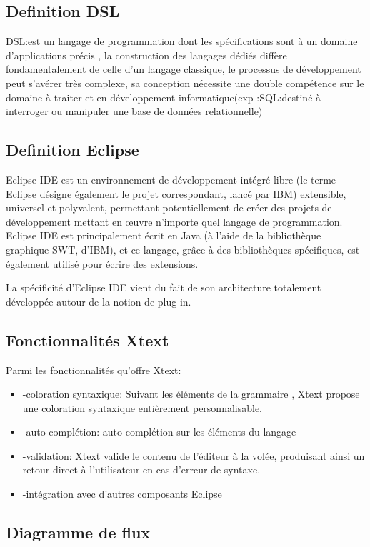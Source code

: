 \documentclass{article}
\begin{document}
\subsection{Definition DSL}
DSL:est un langage de programmation dont les spécifications sont à un domaine d’applications précis , la construction des langages dédiés diffère fondamentalement de celle d’un langage classique, le processus de développement  peut s'avérer très complexe, sa conception nécessite une double compétence sur le domaine à traiter et en développement informatique(exp :SQL:destiné à interroger ou manipuler une base de données relationnelle)

\subsection{Definition Eclipse}
Eclipse IDE est un environnement de développement intégré libre (le terme Eclipse désigne également le projet correspondant, lancé par IBM) extensible, universel et polyvalent, permettant potentiellement de créer des projets de développement mettant en œuvre n'importe quel langage de programmation. Eclipse IDE est principalement écrit en Java (à l'aide de la bibliothèque graphique SWT, d'IBM), et ce langage, grâce à des bibliothèques spécifiques, est également utilisé pour écrire des extensions.

La spécificité d'Eclipse IDE vient du fait de son architecture totalement développée autour de la notion de plug-in.


\subsection{Fonctionnalités Xtext}

Parmi les fonctionnalités qu’offre Xtext:
\begin{itemize}
			\item -coloration syntaxique: Suivant les éléments de la grammaire , Xtext propose une coloration syntaxique entièrement     personnalisable.
			\item -auto complétion: auto complétion sur les éléments du langage 
			\item -validation: Xtext valide le contenu de l'éditeur à la volée, produisant ainsi un retour direct à l’utilisateur en cas d’erreur de syntaxe.
			\item -intégration avec d’autres composants Eclipse 
\end{itemize}

\subsection{Diagramme de flux}
\end{document}
